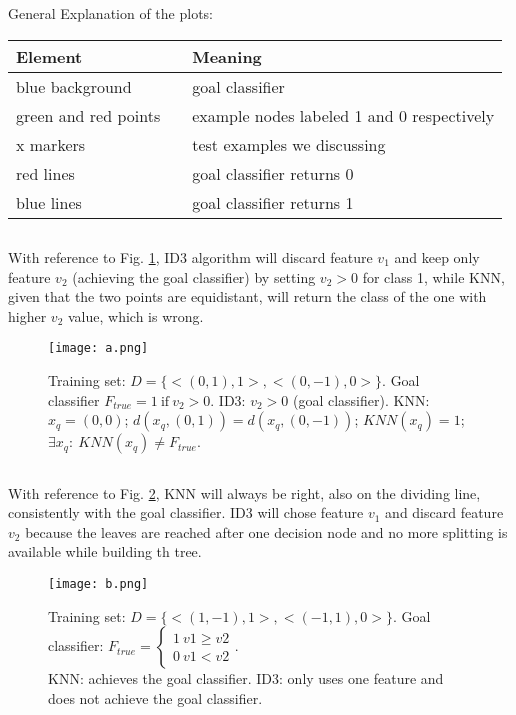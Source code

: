 General Explanation of the plots:
\begin{center}
    \begin{tabular}{ l c l }
        \textbf{Element} & & \textbf{Meaning} \\
        \midrule\midrule
        blue background & & goal classifier \\
        \midrule
        green and red points & & example nodes labeled 1 and 0 respectively \\
        \midrule
        x markers & & test examples we discussing \\
        \midrule
        red lines & & goal classifier returns 0 \\
        \midrule
        blue lines & & goal classifier returns 1 \\
    \end{tabular}
\end{center}


\subsection{}
With reference to Fig. \ref{Q2_a}, ID3 algorithm will discard feature $v_1$ and keep only feature $v_2$ (achieving the goal classifier) by setting $v_{2}>0$ for class 1, while KNN, given that the two points are equidistant, will return the class of the one with higher $v_2$ value, which is wrong.

\begin{figure}[H]
    \centering
    \texttt{[image: a.png]}
    \caption{Training set: $D=\{<(0,1),1>,<(0,-1),0>\}$. Goal classifier $F_{true}=1\ \text{if}\ v_{2}>0$. ID3: $v_{2}>0$ (goal classifier). KNN: $x_{q}=(0,0)$; $d(x_{q},(0,1))=d(x_{q},(0,-1))$; $KNN(x_{q})=1$; $\exists x_{q}:\ KNN(x_{q})\neq F_{true}$.}
    \label{Q2_a}
\end{figure}


\subsection{}
With reference to Fig. \ref{Q2_b}, KNN will always be right, also on the dividing line, consistently with the goal classifier. ID3 will chose feature $v_1$ and discard feature $v_2$ because the leaves are reached after one decision node and no more splitting is available while building th tree.

\begin{figure}[H]
    \centering
    \texttt{[image: b.png]}
    \caption{Training set: $D=\{<(1,-1),1>,<(-1,1),0>\}$. Goal classifier: $F_{true}=\begin{cases} 1\ v1\geq v2\\ 0\ v1<v2 \end{cases}$.\\ KNN: achieves the goal classifier. ID3: only uses one feature and does not achieve the goal classifier.}
    \label{Q2_b}
\end{figure}

